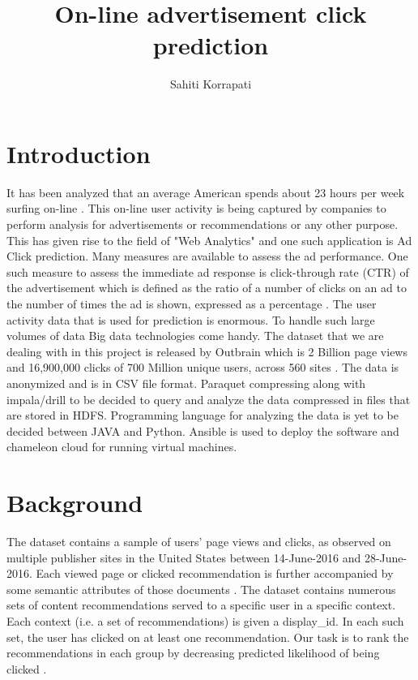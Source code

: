\documentclass[9pt,twocolumn,twoside]{styles/osajnl}
\title{ On-line advertisement click prediction}
\author[1,*]{Sahiti Korrapati}
\affil[1]{School of Informatics and Computing, Bloomington, IN 47408, U.S.A.}
\affil[*]{Corresponding authors: sakorrap@iu.edu, S17-IR-2013}
\begin{document}
\maketitle

\section{Introduction}
It has been analyzed that an average American spends about 23 hours per week surfing on-line \cite{news-social-media}. This on-line user activity is being captured by companies to perform analysis for advertisements or recommendations or any other purpose. This has given rise to the field of "Web Analytics" and one such application is Ad Click prediction.
Many measures are available to assess the ad performance. One such measure to assess the immediate ad response is click-through rate (CTR) of the advertisement \cite{dictionary-clickThrough} which is defined as the ratio of a number of clicks on an ad to the number of times the ad is shown, expressed as a percentage \cite{wiki-clickThrough}.
The user activity data that is used for prediction is enormous. To handle such large volumes of data Big data technologies come handy. The dataset that we are dealing with in this project is released by Outbrain which is 2 Billion page views and 16,900,000 clicks of 700 Million unique users, across 560 sites \cite{kaggle-outbrain}. The data is anonymized and is in CSV file format. Paraquet compressing along with impala/drill to be decided to query and analyze the data compressed in files that are stored in HDFS. Programming language for analyzing the data is yet to be decided between JAVA and Python. Ansible is used to deploy the software and chameleon cloud for running virtual machines.

\section{Background}
The dataset contains a sample of users’ page views and clicks, as observed on multiple publisher sites in the United States between 14-June-2016 and 28-June-2016. Each viewed page or clicked recommendation is further accompanied by some semantic attributes of those documents \cite{kaggle-outbrain}.
The dataset contains numerous sets of content recommendations served to a specific user in a specific context. Each context (i.e. a set of recommendations) is given a display\_id. In each such set, the user has clicked on at least one recommendation. Our task is to rank the recommendations in each group by decreasing predicted likelihood of being clicked \cite{kaggle-outbrain}.
\end{document}
